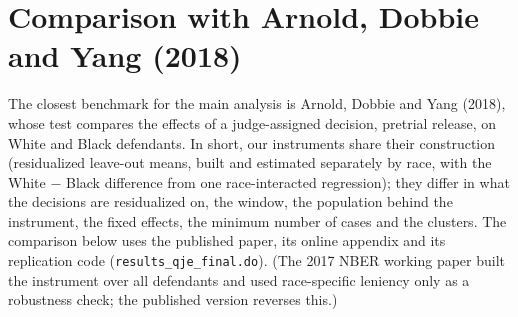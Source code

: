 \documentclass[11pt]{article}
\begin{document}
\section{Comparison with Arnold, Dobbie and Yang (2018)}\label{sec:ady}

The closest benchmark for the main analysis is Arnold, Dobbie and Yang (2018), whose test compares the effects of a judge-assigned decision, pretrial release, on White and Black defendants. In short, our instruments share their construction (residualized leave-out means, built and estimated separately by race, with the White $-$ Black difference from one race-interacted regression); they differ in what the decisions are residualized on, the window, the population behind the instrument, the fixed effects, the minimum number of cases and the clusters. The comparison below uses the published paper, its online appendix and its replication code (\texttt{results\_\allowbreak qje\_\allowbreak final.do}). (The 2017 NBER working paper built the instrument over all defendants and used race-specific leniency only as a robustness check; the published version reverses this.)
\end{document}
